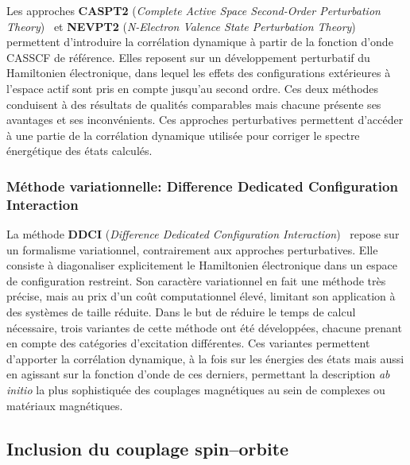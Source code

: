 \documentclass[12pt,a4paper]{report}
\numberwithin{equation}{section}
\begin{document}
Les approches \textbf{CASPT2} (\textit{Complete Active Space Second-Order Perturbation Theory})~\cite{noauthor_second-order_nodate} et \textbf{NEVPT2} (\textit{N-Electron Valence State Perturbation Theory})~\cite{angeli_introduction_2001,angeli_n-electron_2002} permettent d’introduire la corrélation dynamique à partir de la fonction d’onde CASSCF de référence.  
Elles reposent sur un développement perturbatif du Hamiltonien électronique, dans lequel les effets des configurations extérieures à l’espace actif sont pris en compte jusqu’au second ordre.  
Ces deux méthodes conduisent à des résultats de qualités comparables mais chacune présente ses avantages et ses inconvénients.
Ces approches perturbatives permettent d'accéder à une partie de la corrélation dynamique utilisée pour corriger le spectre énergétique des états calculés.

\subsubsection*{ Méthode variationnelle: Difference Dedicated Configuration Interaction}

La méthode \textbf{DDCI} (\textit{Difference Dedicated Configuration Interaction})~\cite{miralles_specific_1993} repose sur un formalisme variationnel, contrairement aux approches perturbatives.  
Elle consiste à diagonaliser explicitement le Hamiltonien électronique dans un espace de configuration restreint.  
Son caractère variationnel en fait une méthode très précise, mais au prix d’un coût computationnel élevé, limitant son application à des systèmes de taille réduite.
Dans le but de réduire le temps de calcul nécessaire, trois variantes de cette méthode ont été développées, chacune prenant en compte des catégories d'excitation différentes.
Ces variantes permettent d'apporter la corrélation dynamique, à la fois sur les énergies des états mais aussi en agissant sur la fonction d'onde de ces derniers, permettant la description \textit{ab initio } la plus sophistiquée des couplages magnétiques au sein de complexes ou matériaux magnétiques.

\subsection*{Inclusion du couplage spin--orbite}
\end{document}
